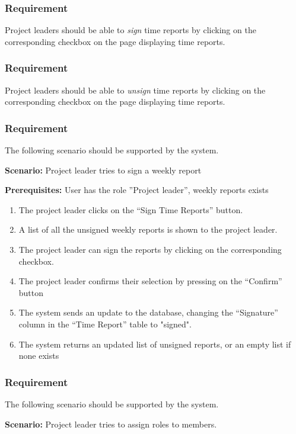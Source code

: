 \documentclass{article}
\begin{document}
\subsubsection{Requirement}
Project leaders should be able to \textit{sign} time reports by clicking on the corresponding checkbox on the page displaying time reports.

\subsubsection{Requirement}
Project leaders should be able to \textit{unsign} time reports by clicking on the corresponding checkbox on the page displaying time reports.

\subsubsection{Requirement}
The following scenario should be supported by the system.

\textbf{Scenario:} Project leader tries to sign a weekly report

\textbf{Prerequisites:} User has the role ”Project leader”, weekly reports exists

\begin{enumerate}
    \item The project leader clicks on the “Sign Time Reports” button.
    \item A list of all the unsigned weekly reports is shown to the project leader.
    \item The project leader can sign the reports by clicking on the corresponding checkbox.
    \item The project leader confirms their selection by pressing on the “Confirm” button
    \item The system sends an update to the database, changing the “Signature” column in the “Time Report” table to "signed".
    \item The system returns an updated list of unsigned reports, or an empty list if none exists
\end{enumerate}

\subsubsection{Requirement}
The following scenario should be supported by the system.

\textbf{Scenario:} Project leader tries to assign roles to members.
\end{document}
